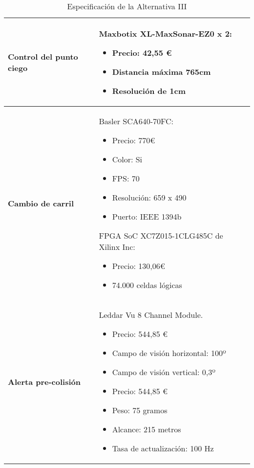 \begin{table}[H]
\begin{center}
\begin{tabular}{p{5cm} p{8cm}}
\textbf{Control del punto ciego} &
Maxbotix XL-MaxSonar-EZ0 x 2:
\begin{itemize}
    \item Precio: 42,55 €
    \item Distancia máxima 765cm
    \item Resolución de 1cm
\end{itemize}
\\ \hline

\textbf{Cambio de carril} &
Basler SCA640-70FC:
\begin{itemize}
    \item Precio: 770€
    \item Color: Si
    \item FPS: 70
    \item Resolución: 659 x 490
    \item Puerto: IEEE 1394b
\end{itemize}
FPGA SoC XC7Z015-1CLG485C de Xilinx Inc:
\begin{itemize}
    \item Precio: 130,06€
    \item 74.000 celdas lógicas
\end{itemize}
\\ \hline

\textbf{Alerta pre-colisión} &
Leddar Vu 8 Channel Module.
\begin{itemize}
    \item Precio: 544,85 €
    \item Campo de visión horizontal: 100º
    \item Campo de visión vertical: 0,3º
    \item Precio: 544,85 €
    \item Peso: 75 gramos
    \item Alcance: 215 metros
    \item Tasa de actualización: 100 Hz
\end{itemize}
\\ \hline

\end{tabular}
\caption{Especificación de la Alternativa III}
\label{tab:altIII}
\end{center}
\end{table}
